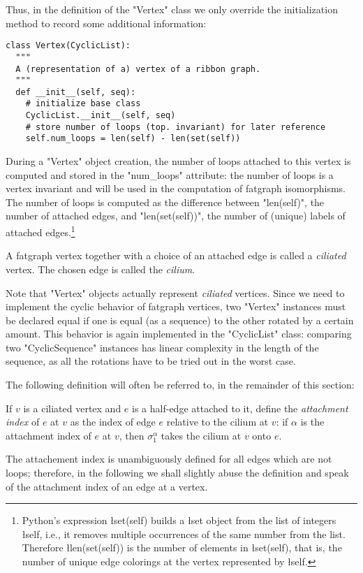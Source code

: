 Thus, in the definition of the "Vertex" class we only override the
initialization method to record some additional information:
\begin{lstlisting}
class Vertex(CyclicList):
  """
  A (representation of a) vertex of a ribbon graph.
  """
  def __init__(self, seq):
    # initialize base class
    CyclicList.__init__(self, seq)
    # store number of loops (top. invariant) for later reference
    self.num_loops = len(self) - len(set(self))

\end{lstlisting}
During a "Vertex" object creation, the number of loops attached to
this vertex is computed and stored in the "num_loops" attribute: the
number of loops is a vertex invariant and will be used in the
computation of fatgraph isomorphisms.  The number of loops is computed
as the difference between "len(self)", the number of attached edges,
and "len(set(self))", the number of (unique) labels of attached
edges.\footnote{Python's expression \l{set(self)} builds a \l{set}
  object from the list of integers \l{self}, i.e., it removes multiple
  occurrences of the same number from the list.  Therefore
  \l{len(set(self))} is the number of elements in \l{set(self)}, that
  is, the number of unique edge colorings at the vertex represented by
  \l{self}.}

\begin{definition}
  A fatgraph vertex together with a choice of an attached edge is
  called a \emph{ciliated} vertex.  The chosen edge is called the
  \emph{cilium}.
\end{definition}
Note that "Vertex" objects actually represent \emph{ciliated} vertices.
Since we need to implement the cyclic behavior of fatgraph vertices,
two "Vertex" instances must be declared equal if one is equal (as a
sequence) to the other rotated by a certain amount.  This behavior is
again implemented in the "CyclicList" class: comparing two
"CyclicSequence" instances has linear complexity in the length of
the sequence, as all the rotations have to be tried out in the worst
case.

The following definition will often be referred to, in the remainder
of this section:
\begin{definition}
  If $v$ is a ciliated vertex and $e$ is a half-edge attached to it, define
  the \emph{attachment index} of $e$ at $v$ as the index of edge $e$ relative
  to the cilium at $v$: if $\alpha$ is the attachment index of $e$ at
  $v$, then $\sigma_1^\alpha$ takes the cilium at $v$ onto $e$.
\end{definition}
The attachement index is unambiguously defined for all edges which are
not loops; therefore, in the following we shall slightly abuse the
definition and speak of the attachment index of an edge at a vertex.


